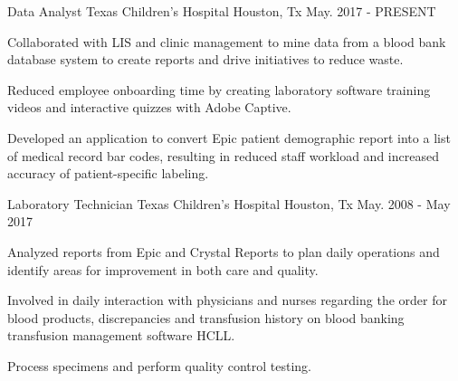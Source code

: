 

\begin{cventries}
	
	
	
	\cventry
	{Data Analyst} %
	{Texas Children's Hospital} %
	{Houston, Tx} %
	{May. 2017 - PRESENT} %
	{
		\begin{cvitems} %
			\item {Collaborated with LIS and clinic management to mine data from a blood bank database system to create reports and drive initiatives to reduce waste.}
			\item {Reduced employee onboarding time by creating laboratory software training videos and interactive quizzes with Adobe Captive.}
			\item {Developed an application to convert Epic patient demographic report into a list of medical record bar codes, resulting in reduced staff workload and increased accuracy of patient-specific labeling.}
		\end{cvitems}
	}
	
	
	\cventry
	{Laboratory Technician} %
	{Texas Children's Hospital} %
	{Houston, Tx} %
	{May. 2008 - May 2017} %
	{
		\begin{cvitems} %
			\item {Analyzed reports from Epic and Crystal Reports to plan daily operations and identify areas for improvement in both care and quality.}
			\item {Involved in daily interaction with physicians and nurses regarding the order for blood products, discrepancies and transfusion history
				on blood banking  transfusion management software HCLL.}
			\item {Process specimens and perform quality control testing.}
		\end{cvitems}
	}
\end{cventries}
